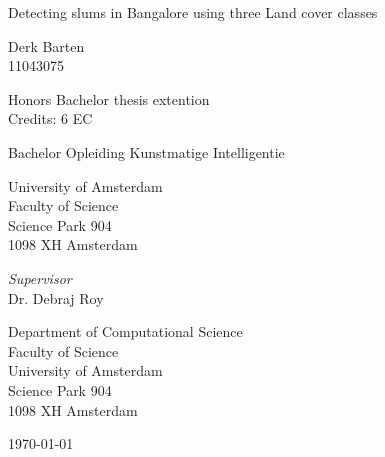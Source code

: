 \begin{center}

\vspace{1.7cm}

\begin{Huge}
Detecting slums in Bangalore using three Land cover classes
\end{Huge}


\vspace{1.5cm}

Derk Barten\\
11043075

\vspace{1.5cm}

Honors Bachelor thesis extention\\
Credits: 6 EC

\vspace{0.5cm}

Bachelor Opleiding Kunstmatige Intelligentie

\vspace{0.25cm}

University of Amsterdam\\
Faculty of Science\\
Science Park 904\\
1098 XH Amsterdam

\vspace{4cm}

\emph{Supervisor}\\
Dr. Debraj Roy

\vspace{0.25cm}

Department of Computational Science\\
Faculty of Science\\
University of Amsterdam\\
Science Park 904\\
1098 XH  Amsterdam

\vspace{1.5cm}

\today

\end{center}

